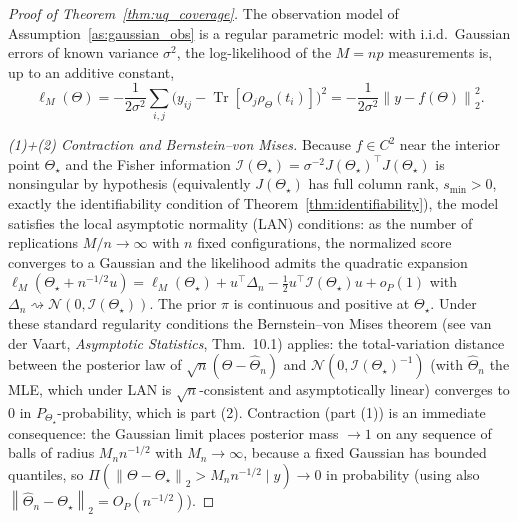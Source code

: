 \documentclass[twocolumn,aps,prxquantum,superscriptaddress,nofootinbib,floatfix,longbibliography]{revtex4-2}
\DeclareMathOperator{\Tr}{Tr}
\newcommand{\norm}[1]{\left\lVert #1 \right\rVert}
\newcommand{\Thetahat}{\widehat{\Theta}}
\begin{document}
\begin{proof}[Proof of Theorem~\ref{thm:uq_coverage}]
The observation model of Assumption~\ref{as:gaussian_obs} is a regular parametric model: with i.i.d.\ Gaussian errors of known variance $\sigma^2$, the log-likelihood of the $M=np$ measurements is, up to an additive constant,
\[
\ell_M(\Theta)=-\frac{1}{2\sigma^2}\sum_{i,j}\big(y_{ij}-\Tr[O_j\rho_\Theta(t_i)]\big)^2=-\frac{1}{2\sigma^2}\norm{y-f(\Theta)}_2^2 .
\]

\emph{(1)+(2) Contraction and Bernstein--von Mises.} Because $f\in C^2$ near the interior point $\Theta_\star$ and the Fisher information $\mathcal{I}(\Theta_\star)=\sigma^{-2}J(\Theta_\star)^\top J(\Theta_\star)$ is nonsingular by hypothesis (equivalently $J(\Theta_\star)$ has full column rank, $s_{\min}>0$, exactly the identifiability condition of Theorem~\ref{thm:identifiability}), the model satisfies the local asymptotic normality (LAN) conditions: as the number of replications $M/n\to\infty$ with $n$ fixed configurations, the normalized score converges to a Gaussian and the likelihood admits the quadratic expansion $\ell_M(\Theta_\star+n^{-1/2}u)=\ell_M(\Theta_\star)+u^\top\Delta_{n}-\tfrac12u^\top \mathcal{I}(\Theta_\star)u+o_P(1)$ with $\Delta_n\rightsquigarrow\mathcal{N}(0,\mathcal{I}(\Theta_\star))$. The prior $\pi$ is continuous and positive at $\Theta_\star$. Under these standard regularity conditions the Bernstein--von Mises theorem (see van der Vaart, \emph{Asymptotic Statistics}, Thm.~10.1) applies: the total-variation distance between the posterior law of $\sqrt n(\Theta-\Thetahat_n)$ and $\mathcal{N}(0,\mathcal{I}(\Theta_\star)^{-1})$ (with $\Thetahat_n$ the MLE, which under LAN is $\sqrt n$-consistent and asymptotically linear) converges to $0$ in $P_{\Theta_\star}$-probability, which is part (2). Contraction (part (1)) is an immediate consequence: the Gaussian limit places posterior mass $\to1$ on any sequence of balls of radius $M_n n^{-1/2}$ with $M_n\to\infty$, because a fixed Gaussian has bounded quantiles, so $\Pi(\norm{\Theta-\Theta_\star}_2>M_nn^{-1/2}\mid y)\to0$ in probability (using also $\norm{\Thetahat_n-\Theta_\star}_2=O_P(n^{-1/2})$).


\end{proof}
\end{document}
